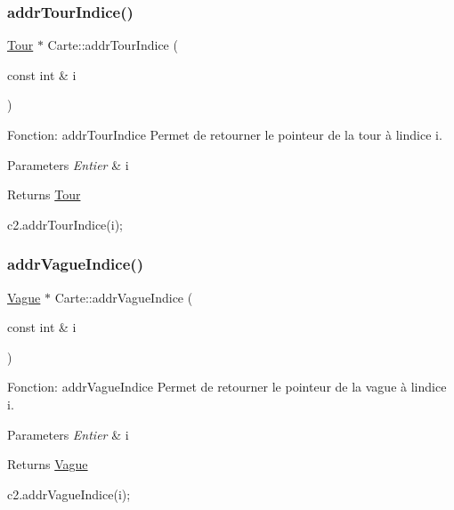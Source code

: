 \subsubsection{\texorpdfstring{addr\+Tour\+Indice()}{addrTourIndice()}}
{\footnotesize\ttfamily \hyperlink{classTour}{Tour} $\ast$ Carte\+::addr\+Tour\+Indice (\begin{DoxyParamCaption}\item[{const int \&}]{i }\end{DoxyParamCaption})}



Fonction\+: addr\+Tour\+Indice Permet de retourner le pointeur de la tour à l\textquotesingle{}indice i. 


\begin{DoxyParams}{Parameters}
{\em Entier} & i \\
\hline
\end{DoxyParams}
\begin{DoxyReturn}{Returns}
\hyperlink{classTour}{Tour} 
\begin{DoxyCode}
c2.addrTourIndice(i);
\end{DoxyCode}
 
\end{DoxyReturn}
\mbox{\label{classCarte_a21708cf932e4d0e74ed0222f7950582a}} 
\subsubsection{\texorpdfstring{addr\+Vague\+Indice()}{addrVagueIndice()}}
{\footnotesize\ttfamily \hyperlink{classVague}{Vague} $\ast$ Carte\+::addr\+Vague\+Indice (\begin{DoxyParamCaption}\item[{const int \&}]{i }\end{DoxyParamCaption})}



Fonction\+: addr\+Vague\+Indice Permet de retourner le pointeur de la vague à l\textquotesingle{}indice i. 


\begin{DoxyParams}{Parameters}
{\em Entier} & i \\
\hline
\end{DoxyParams}
\begin{DoxyReturn}{Returns}
\hyperlink{classVague}{Vague} 
\begin{DoxyCode}
c2.addrVagueIndice(i);
\end{DoxyCode}
 
\end{DoxyReturn}
\mbox{\label{classCarte_ac665513f49b01111c18e7f482eb346d2}} 
